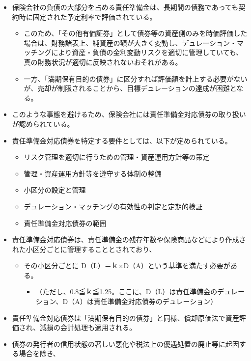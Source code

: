 \documentclass[report,gutter=10mm,fore-edge=10mm,uplatex,dvipdfmx]{jlreq}
\begin{document}
\begin{itemize}
\tightlist
\item
  保険会社の負債の大部分を占める責任準備金は、長期間の債務であっても契約時に固定された予定利率で評価されている。

  \begin{itemize}
  \tightlist
  \item
    このため、「その他有価証券」として債券等の資産側のみを時価評価した場合は、財務諸表上、純資産の額が大きく変動し、デュレーション・マッチングにより資産・負債の金利変動リスクを適切に管理していても、真の財務状況が適切に反映されないおそれがある。
  \item
    一方、「満期保有目的の債券」に区分すれば評価額を計上する必要がないが、売却が制限されることから、目標デュレーションの達成が困難となる。
  \end{itemize}
\item
  このような事態を避けるため、保険会社には責任準備金対応債券の取り扱いが認められている。
\item
  責任準備金対応債券を特定する要件としては、以下が定められている。

  \begin{itemize}
  \tightlist
  \item
    リスク管理を適切に行うための管理・資産運用方針等の策定
  \item
    管理・資産運用方針等を遵守する体制の整備
  \item
    小区分の設定と管理
  \item
    デュレーション・マッチングの有効性の判定と定期的検証
  \item
    責任準備金対応債券の範囲
  \end{itemize}
\item
  責任準備金対応債券は、責任準備金の残存年数や保険商品などにより作成された小区分ごとに管理することとされており、

  \begin{itemize}
  \tightlist
  \item
    その小区分ごとに D（L）＝ｋ×D（A）という基準を満たす必要がある。

    \begin{itemize}
    \tightlist
    \item
      （ただし、0.8≦ｋ≦1.25。ここに、D（L）は責任準備金のデュレーション、D（A）は責任準備金対応債券のデュレーション）
    \end{itemize}
  \end{itemize}
\item
  責任準備金対応債券は「満期保有目的の債券」と同様、償却原価法で資産評価され、減損の会計処理も適用される。
\item
  債券の発行者の信用状態の著しい悪化や税法上の優遇処置の廃止等に起因する場合を除き、


\end{itemize}
\end{document}
